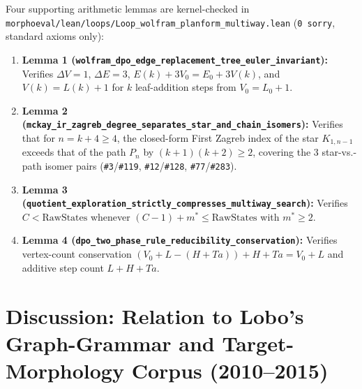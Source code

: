 \documentclass[11pt,a4paper]{article}
\theoremstyle{definition}
\theoremstyle{remark}
\begin{document}
Four supporting arithmetic lemmas are kernel-checked in \texttt{morphoeval/lean/loops/Loop\_wolfram\_planform\_multiway.lean} (\texttt{0 sorry}, standard axioms only):
\begin{enumerate}
  \item \textbf{Lemma 1 (\texttt{wolfram\_dpo\_edge\_replacement\_tree\_euler\_invariant}):} Verifies $\Delta V = 1$, $\Delta E = 3$, $E(k) + 3V_0 = E_0 + 3V(k)$, and $V(k) = L(k) + 1$ for $k$ leaf-addition steps from $V_0 = L_0 + 1$.
  \item \textbf{Lemma 2 (\texttt{mckay\_ir\_zagreb\_degree\_separates\_star\_and\_chain\_isomers}):} Verifies that for $n = k + 4 \ge 4$, the closed-form First Zagreb index of the star $K_{1, n-1}$ exceeds that of the path $P_n$ by $(k+1)(k+2) \ge 2$, covering the 3 star-vs.-path isomer pairs (\texttt{\#3}/\texttt{\#119}, \texttt{\#12}/\texttt{\#128}, \texttt{\#77}/\texttt{\#283}).
  \item \textbf{Lemma 3 (\texttt{quotient\_exploration\_strictly\_compresses\_multiway\_search}):} Verifies $C < \text{RawStates}$ whenever $(C - 1) + m^* \le \text{RawStates}$ with $m^* \ge 2$.
  \item \textbf{Lemma 4 (\texttt{dpo\_two\_phase\_rule\_reducibility\_conservation}):} Verifies vertex-count conservation $(V_0 + L - (H + Ta)) + H + Ta = V_0 + L$ and additive step count $L + H + Ta$.
\end{enumerate}

\section{Discussion: Relation to Lobo's Graph-Grammar and Target-Morphology Corpus (2010--2015)}
\end{document}
